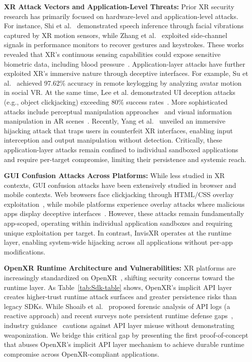 \documentclass[letterpaper,twocolumn,10pt]{article}
\begin{document}
\textbf{XR Attack Vectors and Application-Level Threats:}  Prior XR security research has primarily focused on hardware-level and application-level attacks. For instance, Shi et al.~\cite{shi2021face} demonstrated speech inference through facial vibrations captured by XR motion sensors, while Zhang et al.~\cite{zhang2023s} exploited side-channel signals in performance monitors to recover gestures and keystrokes. These works revealed that XR's continuous sensing capabilities could expose sensitive biometric data, including blood pressure~\cite{ye2025bpsniff}. Application-layer attacks have further exploited XR's immersive nature through deceptive interfaces. For example, Su et al.~\cite{su2024remote} achieved 97.62\% accuracy in remote keylogging by analyzing avatar motion in social VR. At the same time, Lee et al. demonstrated UI deception attacks (e.g., object clickjacking) exceeding 80\% success rates~\cite{lee2025illusion}. More sophisticated attacks include perceptual manipulation approaches~\cite{cheng2023exploring} and visual information manipulation in AR scenes~\cite{xiu2025detecting}. Recently, Yang et al.~\cite{yang2024inception} unveiled an immersive hijacking attack that traps users in counterfeit XR interfaces, enabling input interception and output manipulation without detection. Critically, these application-layer attacks remain confined to individual sandboxed applications and require per-target compromise, limiting their persistence and systemic reach.

\textbf{GUI Confusion Attacks Across Platforms:} While less studied in XR contexts, GUI confusion attacks have been extensively studied in browser and mobile contexts. Web browsers face clickjacking through HTML/CSS overlay exploitation~\cite{huang2012clickjacking}, while mobile platforms experience overlay attacks where malicious apps display deceptive interfaces~\cite{fratantonio2017cloak,ren2017windowguard}. However, these attacks remain fundamentally app-scoped, operating within individual application sandboxes and requiring unique exploitation per target. In contrast, InvisXR operates at the runtime layer, enabling system-wide hijacking across all applications without per-app modifications.

\textbf{OpenXR Runtime Architecture and Vulnerabilities:} XR platforms are increasingly standardized on OpenXR~\cite{openxr_sdk}, shifting security concerns toward the runtime layer. As Table~\ref{tab:Sdk-table} shows, OpenXR's implicit API layer creates higher-trust runtime attack surfaces and greater persistence risks than legacy SDKs. While Shoaib et al.~\cite{shoaib2023principled} proposed forensic analysis of API logs (a reactive approach) and recent surveys note persistent runtime defense gaps~\cite{lake2024cybersecurity}, industry guidance~\cite{emmott2024openxr,microsoft_openxr} cautions against API layer misuse without demonstrating weaponization. We bridge this critical gap by presenting the first proof-of-concept that abuses OpenXR's implicit API layer mechanism to achieve durable runtime compromise across OpenXR-compliant applications.
\end{document}
